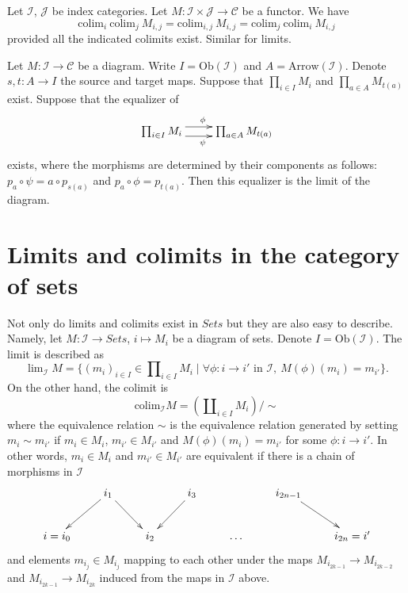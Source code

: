 \begin{lemma}
\label{lemma-colimits-commute}
Let $\mathcal{I}$, $\mathcal{J}$ be index categories.
Let $M : \mathcal{I} \times \mathcal{J} \to \mathcal{C}$ be a functor.
We have
$$
\text{colim}_i\ \text{colim}_j\ M_{i,j}
=
\text{colim}_{i,j}\ M_{i,j}
=
\text{colim}_j\ \text{colim}_i\ M_{i,j}
$$
provided all the indicated colimits exist. Similar for limits.
\end{lemma}

\begin{lemma}
\label{lemma-limits-products-equalizers}
Let $M : \mathcal{I} \to \mathcal{C}$ be a diagram.
Write $I = \text{Ob}(\mathcal{I})$ and $A = \text{Arrow}(\mathcal{I})$.
Denote $s,t : A \to I$ the source and target maps.
Suppose that $\prod_{i \in I} M_i$ and $\prod_{a \in A} M_{t(a)}$
exist. Suppose that the equalizer of 
$$
\xymatrix{
\prod_{i \in I} M_i
\ar@<1ex>[r]^\phi \ar@<-1ex>[r]_\psi
&
\prod_{a \in A} M_{t(a)}
}
$$
exists, where the morphisms are determined by their components
as follows: $p_a \circ \psi = a \circ p_{s(a)}$
and $p_a \circ \phi = p_{t(a)}$. Then this equalizer is the
limit of the diagram.
\end{lemma}

\section{Limits and colimits in the category of sets}
\label{section-limit-sets}

\noindent
Not only do limits and colimits exist in $\textit{Sets}$
but they are also easy to describe. Namely, let $M : \mathcal{I}
\to \textit{Sets}$, $i \mapsto M_i$ be a diagram of sets.
Denote $I = \text{Ob}(\mathcal{I})$.
The limit is described as
$$
\lim\nolimits_{\mathcal{I}} M
=
\{
(m_i)_{i\in I} \in \prod\nolimits_{i\in I} M_i
\mid
\forall \phi : i \to i' \text{ in }\mathcal{I},\ 
M(\phi)(m_i) = m_{i'}
\}.
$$
On the other hand, the colimit is
$$
\text{colim}_{\mathcal{I}} M
=
(\coprod\nolimits_{i\in I} M_i)/\sim
$$
where the equivalence relation $\sim$ is the equivalence relation
generated by setting $m_i \sim m_{i'}$ if $m_i \in M_i$,
$m_{i'} \in M_{i'}$ and $M(\phi)(m_i) = m_{i'}$ for some
$\phi : i \to i'$. In other words, $m_i \in M_i$
and $m_{i'} \in M_{i'}$ are equivalent if there is a
chain of morphisms in $\mathcal{I}$
$$
\xymatrix{
&
i_1 \ar[ld] \ar[rd]
&
&
i_3 \ar[ld]
&
&
i_{2n-1} \ar[rd]
&
\\
i = i_0 
&
&
i_2
&
&
\ldots
&
&
i_{2n} = i'
}
$$
and elements $m_{i_j} \in M_{i_j}$ mapping to each other under
the maps $M_{i_{2k-1}} \to M_{i_{2k-2}}$ and $M_{i_{2k-1}}
\to M_{i_{2k}}$ induced from the maps in $\mathcal{I}$ above.

